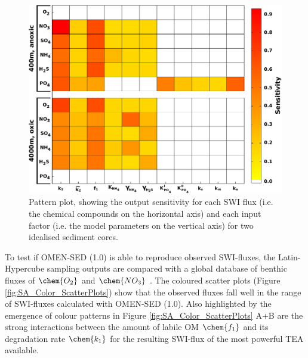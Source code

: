 \documentclass[gmd, manuscript]{copernicus}
\begin{document}
\begin{figure}[htbp]
\begin{center}
	\includegraphics[width=1.0\textwidth]{figures/SA/0_KSIndex_ALL_OUTPUT_WHITE.pdf}
	\caption{Pattern plot, showing the output sensitivity for each SWI flux (i.e. the chemical compounds on the horizontal axis) and each input factor (i.e. the model parameters 
	on the vertical axis) for two idealised sediment cores. }
	\label{fig:Sensitivity_Analysis}
	\end{center}
\end{figure}

To test if OMEN-SED (1.0) is able to reproduce observed SWI-fluxes, the Latin-Hypercube sampling outputs are compared with a global database of benthic fluxes of $\chem{O_2}$ and $\chem{NO_3}$ \citep{bohlen_simple_2012}. 
The coloured scatter plots (Figure \ref{fig:SA_Color_ScatterPlots}) show that the observed fluxes fall well in the range of SWI-fluxes calculated with OMEN-SED (1.0). Also highlighted by the emergence of colour patterns 
in Figure \ref{fig:SA_Color_ScatterPlots} A+B are the strong interactions between the amount of labile OM  $\chem{f_1}$ and its degradation rate $\chem{k_1}$ for the resulting SWI-flux of the most powerful TEA available. 

\end{document}

